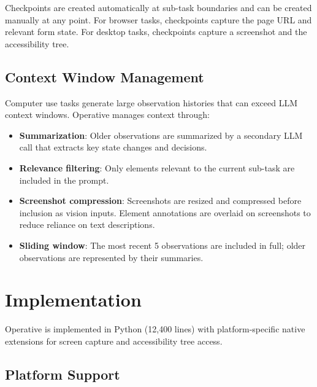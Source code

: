 \documentclass[11pt,twocolumn]{article}
\begin{document}
Checkpoints are created automatically at sub-task boundaries and can be created manually at any point. For browser tasks, checkpoints capture the page URL and relevant form state. For desktop tasks, checkpoints capture a screenshot and the accessibility tree.

\subsection{Context Window Management}

Computer use tasks generate large observation histories that can exceed LLM context windows. Operative manages context through:

\begin{itemize}[leftmargin=*]
    \item \textbf{Summarization}: Older observations are summarized by a secondary LLM call that extracts key state changes and decisions.
    \item \textbf{Relevance filtering}: Only elements relevant to the current sub-task are included in the prompt.
    \item \textbf{Screenshot compression}: Screenshots are resized and compressed before inclusion as vision inputs. Element annotations are overlaid on screenshots to reduce reliance on text descriptions.
    \item \textbf{Sliding window}: The most recent 5 observations are included in full; older observations are represented by their summaries.
\end{itemize}

\section{Implementation}
\label{sec:implementation}

Operative is implemented in Python (12,400 lines) with platform-specific native extensions for screen capture and accessibility tree access.

\subsection{Platform Support}
\end{document}
